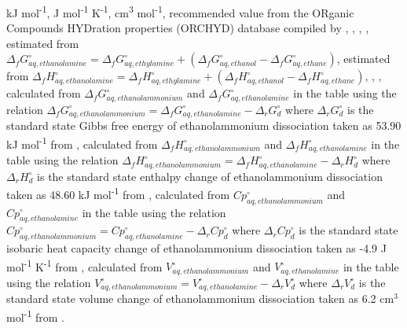 {\begin{table}
\begin{threeparttable}
  \begin{tablenotes}
     kJ mol\textsuperscript{-1},
     J mol\textsuperscript{-1} K\textsuperscript{-1},
     cm\textsuperscript{3} mol\textsuperscript{-1},
     recommended value from the ORganic Compounds HYDration properties (ORCHYD) database compiled by \cite{plyasunova2004database},
     \cite{ben1984solvation},
     \cite{pliego2000new},
     \cite{shock1990calculation},
     estimated from $\Delta_{f}G^{\circ}_{aq, ethanolamine} = \Delta_{f}G^{\circ}_{aq, ethylamine} + (\Delta_{f}G^{\circ}_{aq, ethanol} - \Delta_{f}G^{\circ}_{aq, ethane})$,
     estimated from $\Delta_{f}H^{\circ}_{aq, ethanolamine} = \Delta_{f}H^{\circ}_{aq, ethylamine} + (\Delta_{f}H^{\circ}_{aq, ethanol} - \Delta_{f}H^{\circ}_{aq, ethane})$,
     \cite{cabani1981group},
     \cite{maham1994densities},
     calculated from $\Delta_{f}G^{\circ}_{aq, ethanolammonium}$ and  $\Delta_{f}G^{\circ}_{aq, ethanolamine}$ in the table using the relation $\Delta_{f}G^{\circ}_{aq, ethanolammonium} = \Delta_{f}G^{\circ}_{aq, ethanolamine} - \Delta_{r}G^{\circ}_{d}$ where $\Delta_{r}G^{\circ}_{d}$ is the standard state Gibbs free energy of ethanolammonium dissociation taken as 53.90 kJ mol\textsuperscript{-1} from \cite{hamborg2009dissociation},
     calculated from $\Delta_{f}H^{\circ}_{aq, ethanolammonium}$ and  $\Delta_{f}H^{\circ}_{aq, ethanolamine}$ in the table using the relation $\Delta_{f}H^{\circ}_{aq, ethanolammonium} = \Delta_{f}H^{\circ}_{aq, ethanolamine} - \Delta_{r}H^{\circ}_{d}$ where $\Delta_{r}H^{\circ}_{d}$ is the standard state enthalpy change of ethanolammonium dissociation taken as 48.60 kJ mol\textsuperscript{-1} from \cite{hamborg2009dissociation},
     calculated from $Cp^{\circ}_{aq, ethanolammonium}$ and $Cp^{\circ}_{aq, ethanolamine}$ in the table using the relation $Cp^{\circ}_{aq, ethanolammonium} = Cp^{\circ}_{aq, ethanolamine} - \Delta_{r}Cp^{\circ}_{d}$ where $\Delta_{r}Cp^{\circ}_{d}$ is the standard state isobaric heat capacity change of ethanolammonium dissociation taken as -4.9 J mol\textsuperscript{-1} K\textsuperscript{-1} from \cite{bates1951acidic},
     calculated from $V^{\circ}_{aq, ethanolammonium}$ and $V^{\circ}_{aq, ethanolamine}$ in the table using the relation $V^{\circ}_{aq, ethanolammonium} = V^{\circ}_{aq, ethanolamine} - \Delta_{r}V^{\circ}_{d}$ where $\Delta_{r}V^{\circ}_{d}$ is the standard state volume change of ethanolammonium dissociation taken as 6.2 cm$^3$ mol\textsuperscript{-1} from \cite{cabani1977volume2}.
        

\end{tablenotes}
\end{threeparttable}
\end{table}}
